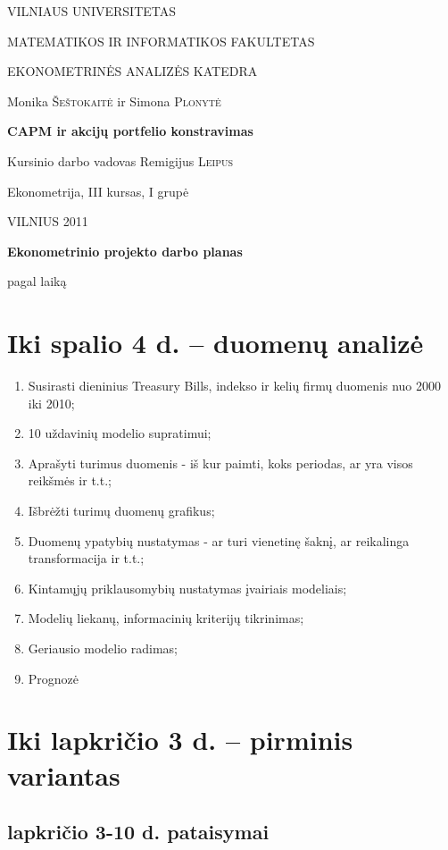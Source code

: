 \documentclass[a4paper]{article}
\begin{document}
\begin{titlepage}
\centerline{ \large VILNIAUS UNIVERSITETAS}
\bigskip
\centerline{\large MATEMATIKOS IR INFORMATIKOS FAKULTETAS}
\smallskip

\centerline{\large  EKONOMETRINĖS ANALIZĖS KATEDRA}
\vskip 200pt
\centerline{ \large Monika \textsc{Šeštokaitė} ir \large Simona \textsc{Plonytė}}
\vskip 50pt
\centerline{\bf \Large CAPM ir akcijų portfelio konstravimas}
\bigskip
\vskip 25pt
\centerline{Kursinio darbo vadovas \large {Remigijus} \textsc{Leipus}}
\vskip 25pt
\hfill Ekonometrija, III kursas, I grupė
\vskip 100pt
\centerline{\large VILNIUS 2011}
\end{titlepage}

\pagebreak

\centerline{\bf \Large Ekonometrinio projekto darbo planas}
\centerline{pagal laiką}

\section{ Iki spalio 4 d. -- duomenų analizė }


\begin{enumerate}
\item {Susirasti dieninius Treasury Bills, indekso ir kelių firmų duomenis nuo 2000 iki 2010;}
\item {10 uždavinių modelio supratimui;}
\item {Aprašyti turimus duomenis - iš kur paimti, koks periodas, ar yra visos reikšmės ir t.t.;}
\item {Išbrėžti turimų duomenų grafikus;}
\item {Duomenų ypatybių nustatymas - ar turi vienetinę šaknį, ar reikalinga transformacija ir t.t.;}
\item {Kintamųjų priklausomybių nustatymas įvairiais modeliais;}
\item {Modelių liekanų, informacinių kriterijų tikrinimas;}
\item {Geriausio modelio radimas;}
\item {Prognozė}
\end{enumerate}


\section{ Iki lapkričio 3 d. -- pirminis variantas}
\subsection{lapkričio 3-10 d. pataisymai}
\end{document}
